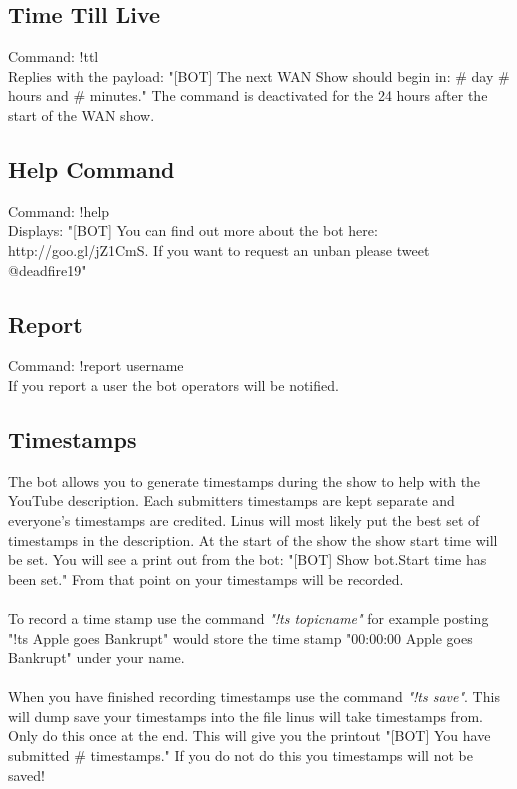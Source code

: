 \documentclass[10pt]{article}
\begin{document}
\subsection{Time Till Live}
Command: !ttl\\
Replies with the payload: "[BOT] The next WAN Show should begin in: \# day \# hours and \# minutes."
The command is deactivated for the 24 hours after the start of the WAN show.
\subsection{Help Command}
Command: !help\\
Displays: "[BOT] You can find out more about the bot here: http://goo.gl/jZ1CmS. If you want to request an unban please tweet @deadfire19"
\subsection{Report}
Command: !report username\\
If you report a user the bot operators will be notified.
\subsection{Timestamps}
The bot allows you to generate timestamps during the show to help with the YouTube description. Each submitters timestamps are kept separate and everyone's timestamps are credited. Linus will most likely put the best set of timestamps in the description. At the start of the show the show start time will be set. You will see a print out from the bot: "[BOT] Show bot.Start time has been set." From that point on your timestamps will be recorded.\\\\
 
To record a time stamp use the command \emph{"!ts topicname"} for example posting  "!ts Apple goes Bankrupt" would store the time stamp "00:00:00 Apple goes Bankrupt" under your name.
 \\\\
When you have finished recording timestamps use the command \emph{"!ts save"}. This will dump save your timestamps into the file linus will take timestamps from. Only do this once at the end. This will give you the printout "[BOT] You have submitted \# timestamps." If you do not do this you timestamps will not be saved!
\end{document}
